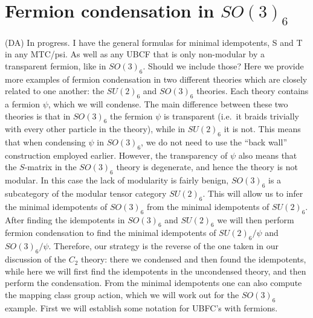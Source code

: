 \documentclass[12pt,a4paper]{article}
\newcommand{\zt}{\mathbb{Z}_2}
\newcommand{\kw}[1]{{\color{kwcolor}\footnotesize{(KW) #1}}}
\newcommand{\dave}[1]{{\color{ao(english)}\footnotesize{(DA) #1}}}
\begin{document}
\section{Fermion condensation in $SO(3)_6$} \label{so36}
\dave{In progress. I have the general formulas for minimal idempotents, S and T in any MTC/psi. 
As well as any UBCF that is only non-modular by a transparent fermion, like in $SO(3)_6$.
Should we include those?}
Here we provide more examples of fermion condensation in two different theories which are closely related to one another:
the $SU(2)_6$ and $SO(3)_6$ theories. 
Each theory contains a fermion $\psi$, which we will condense. 
The main difference between these two theories is that in $SO(3)_6$ the fermion $\psi$ is transparent (i.e.\ it braids trivially with every other particle in the theory), while in $SU(2)_6$ it is not. 
This means that when condensing $\psi$ in $SO(3)_6$, we do not need to use the ``back wall'' construction employed earlier. 
However, the transparency of $\psi$ also means that the $S$-matrix in the $SO(3)_6$ theory is degenerate, and hence the theory is not modular. 
In this case the lack of modularity is fairly benign, $SO(3)_6$ is a subcategory of the modular tensor category $SU(2)_6$.
This will allow us to infer the minimal idempotents of $SO(3)_6$ from the minimal idempotents of $SU(2)_6$.
After finding the idempotents in $SO(3)_6$ and $SU(2)_6$ we will then perform fermion condensation to find the minimal idempotents of $SU(2)_6/\psi$ and $SO(3)_6/\psi$. 
Therefore, our strategy is the reverse of the one taken in our discussion of the $C_2$ theory: there we condensed and then found the idempotents, while here we will first find the idempotents in the uncondensed theory, 
and then perform the condensation.
From the minimal idempotents one can also compute the mapping class group action, which we will work out for the $SO(3)_6$ example.
First we will establish some notation for UBFC's with fermions.
\end{document}
